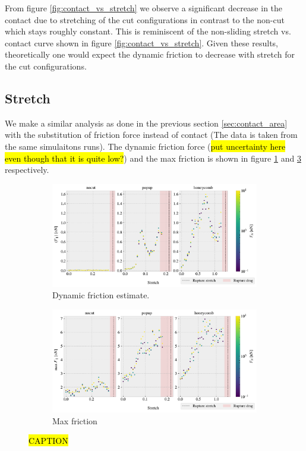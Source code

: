 From figure \ref{fig:contact_vs_stretch} we observe a significant decrease in the contact due to stretching of the cut configurations in contrast to the non-cut which stays roughly constant. This is reminiscent of the non-sliding stretch vs. contact curve shown in figure \ref{fig:contact_vs_stretch}. Given these results, theoretically one would expect the dynamic friction to decrease with stretch for the cut configurations.


\subsection{Stretch} 

We make a similar analysis as done in the previous section \ref{sec:contact_area} with the substitution of friction force instead of contact (The data is taken from the same simulaitons runs). The dynamic friction force (\hl{put uncertainty here even though that it is quite low?}) and the max friction is shown in figure \ref{fig:multi_stretch_mean_fric} and \ref{fig:multi_stretch_max_fric} respectively.



\begin{figure}[H]
  \centering
  \begin{subfigure}[t]{\textwidth}
      \centering
      \includegraphics[width=\textwidth]{figures/baseline/multi_stretch_mean_compare.pdf}
      \caption{Dynamic friction estimate. }
      \label{fig:multi_stretch_mean_fric}
  \end{subfigure}
  \hfill
  \begin{subfigure}[t]{\textwidth}
      \centering
      \includegraphics[width=\textwidth]{figures/baseline/multi_stretch_max_compare.pdf}
      \caption{Max friction}
      \label{fig:multi_stretch_max_fric}
  \end{subfigure}
  \hfill
     \caption{\hl{CAPTION}}
     \label{fig:multi_stretch_max_fric}
\end{figure}


